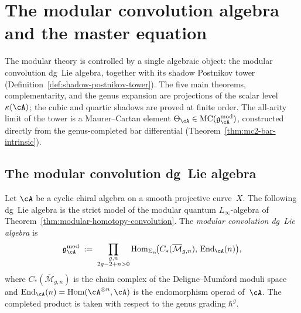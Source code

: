 \section{The modular convolution algebra and the master equation}
\label{sec:modular-bar-hamiltonian}

The modular theory is controlled by a single
algebraic object: the modular convolution dg~Lie algebra, together
with its shadow Postnikov tower
(Definition~\ref{def:shadow-postnikov-tower}).
The five main theorems, complementarity, and the genus
expansion are projections of the scalar level~$\kappa(\cA)$;
the cubic and quartic shadows are proved at finite order.
The all-arity limit of the tower is a
Maurer--Cartan element
$\Theta_{\cA} \in \operatorname{MC}(\mathfrak{g}^{\mathrm{mod}}_{\cA})$,
constructed directly from the genus-completed bar differential
(Theorem~\ref{thm:mc2-bar-intrinsic}).

\subsection{The modular convolution dg~Lie algebra}
\label{subsec:modular-convolution-algebra}

\begin{definition}
\label{def:modular-convolution-dg-lie}
Let $\cA$ be a cyclic chiral algebra on a smooth projective curve~$X$.
The following dg~Lie algebra is the strict model of the modular
quantum $L_\infty$-algebra of
Theorem~\ref{thm:modular-homotopy-convolution}.
The \emph{modular convolution dg~Lie algebra} is
\begin{equation}
\label{eq:modular-convolution}
\mathfrak{g}_{\cA}^{\mathrm{mod}}
\;:=\;
\prod_{\substack{g,n \\ 2g-2+n > 0}}
\operatorname{Hom}_{\Sigma_n}\!\bigl(
C_*(\overline{\mathcal{M}}_{g,n}),\,
\operatorname{End}_{\cA}(n)
\bigr),
\end{equation}
where $C_*(\overline{\mathcal{M}}_{g,n})$ is the chain complex of
the Deligne--Mumford moduli space and
$\operatorname{End}_{\cA}(n) = \operatorname{Hom}(\cA^{\otimes n}, \cA)$
is the endomorphism operad of~$\cA$.  The completed product is taken
with respect to the genus grading $\hbar^g$.
\end{definition}

